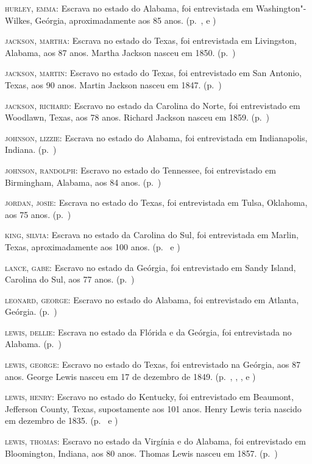 \begin{Parskip}
\textsc{hurley, emma:} Escrava no estado do Alabama, foi entrevistada em
Washington"-Wilkes, Geórgia, aproximadamente aos 85 anos. (p.~\pageref{ref157}, \pageref{ref158} e \pageref{ref159})

\textsc{jackson, martha:} Escrava no estado do Texas, foi entrevistada
em Livingston, Alabama, aos 87 anos. Martha Jackson nasceu em 1850. (p.~\pageref{ref160})

\textsc{jackson, martin:} Escravo no estado do Texas, foi entrevistado
em San Antonio, Texas, aos 90 anos. Martin Jackson nasceu em 1847. (p.~\pageref{ref161})

\textsc{jackson, richard:} Escravo no estado da Carolina do Norte, foi
entrevistado em Woodlawn, Texas, aos 78 anos. Richard Jackson nasceu em
1859. (p.~\pageref{ref162})

\textsc{johnson, lizzie:} Escrava no estado do Alabama, foi entrevistada
em Indianapolis, Indiana. (p.~\pageref{ref163})

\textsc{johnson, randolph:} Escravo no estado do Tennessee, foi
entrevistado em Birmingham, Alabama, aos 84 anos. (p.~\pageref{ref164})

\textsc{jordan, josie:} Escrava no estado do Texas, foi entrevistada em
Tulsa, Oklahoma, aos 75 anos. (p.~\pageref{ref165})

\textsc{king, silvia:} Escrava no estado da Carolina do Sul, foi
entrevistada em Marlin, Texas, aproximadamente aos 100 anos. (p.~\pageref{ref166} e \pageref{ref167})

\textsc{lance, gabe:} Escravo no estado da Geórgia, foi entrevistado em
Sandy Island, Carolina do Sul, aos 77 anos. (p.~\pageref{ref168})

\textsc{leonard, george:} Escravo no estado do Alabama, foi entrevistado
em Atlanta, Geórgia. (p.~\pageref{ref169})

\textsc{lewis, dellie:} Escrava no estado da Flórida e da Geórgia, foi
entrevistada no Alabama. (p.~\pageref{ref170})

\textsc{lewis, george:} Escravo no estado do Texas, foi entrevistado na
Geórgia, aos 87 anos. George Lewis nasceu em 17 de dezembro de 1849. (p.~\pageref{ref171}, \pageref{ref172}, \pageref{ref173}, \pageref{ref174} e \pageref{ref175})

\textsc{lewis, henry:} Escravo no estado do Kentucky, foi entrevistado
em Beaumont, Jefferson County, Texas, supostamente aos 101 anos. Henry
Lewis teria nascido em dezembro de 1835. (p.~\pageref{ref176} e \pageref{ref177})

\textsc{lewis, thomas:} Escravo no estado da Virgínia e do Alabama, foi
entrevistado em Bloomington, Indiana, aos 80 anos. Thomas Lewis nasceu
em 1857. (p.~\pageref{ref178})


\end{Parskip}
